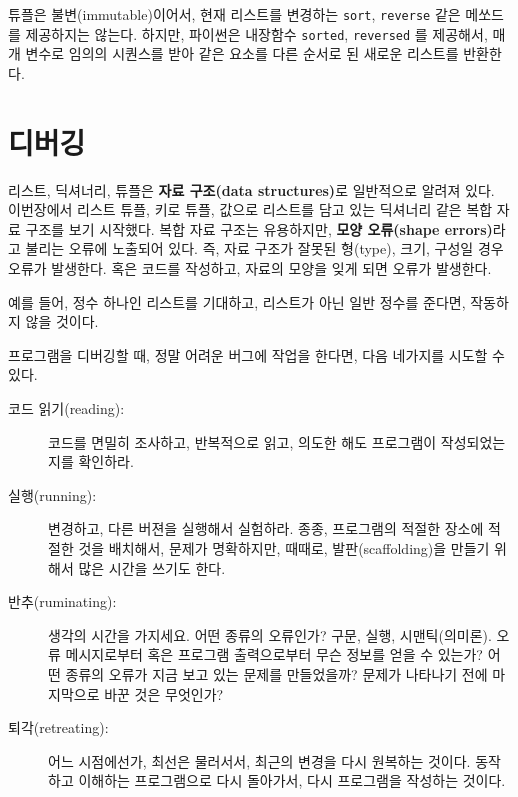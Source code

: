 튜플은 불변(immutable)이어서, 현재 리스트를 변경하는 {\tt sort}, {\tt reverse} 같은 메쏘드를 제공하지는 않는다.
하지만, 파이썬은 내장함수 {\tt sorted}, {\tt reversed} 를 제공해서, 매개 변수로 임의의 시퀀스를 받아 같은 요소를 다른 순서로 된 새로운 리스트를 반환한다.



\section{디버깅}


리스트, 딕셔너리, 튜플은 {\bf 자료 구조(data structures)}로 일반적으로 알려져 있다.
이번장에서 리스트 튜플, 키로 튜플, 값으로 리스트를 담고 있는 딕셔너리 같은 복합 자료 구조를 보기 시작했다.
복합 자료 구조는 유용하지만,  {\bf 모양 오류(shape errors)}라고 불리는 오류에 노출되어 있다.
즉, 자료 구조가 잘못된 형(type), 크기, 구성일 경우 오류가 발생한다. 
혹은 코드를 작성하고, 자료의 모양을 잊게 되면 오류가 발생한다.

예를 들어, 정수 하나인 리스트를 기대하고, 리스트가 아닌 일반 정수를 준다면, 작동하지 않을 것이다.

프로그램을 디버깅할 때, 정말 어려운 버그에 작업을 한다면, 다음 네가지를 시도할 수 있다.

\begin{description}

\item[코드 읽기(reading):] 
코드를 면밀히 조사하고, 반복적으로 읽고, 의도한 해도 프로그램이 작성되었는지를 확인하라.

\item[실행(running):] 변경하고, 다른 버젼을 실행해서 실험하라. 종종, 프로그램의 적절한 장소에 적절한 것을 배치해서,
문제가 명확하지만, 때때로, 발판(scaffolding)을 만들기 위해서 많은 시간을 쓰기도 한다.

\item[반추(ruminating):] 
생각의 시간을 가지세요. 어떤 종류의 오류인가? 구문, 실행, 시맨틱(의미론). 
오류 메시지로부터 혹은 프로그램 출력으로부터 무슨 정보를 얻을 수 있는가?
어떤 종류의 오류가 지금 보고 있는 문제를 만들었을까? 문제가 나타나기 전에 마지막으로 바꾼 것은 무엇인가?

\item[퇴각(retreating):]
어느 시점에선가, 최선은 물러서서, 최근의 변경을 다시 원복하는 것이다. 
동작하고 이해하는 프로그램으로 다시 돌아가서, 다시 프로그램을 작성하는 것이다.
\end{description}

